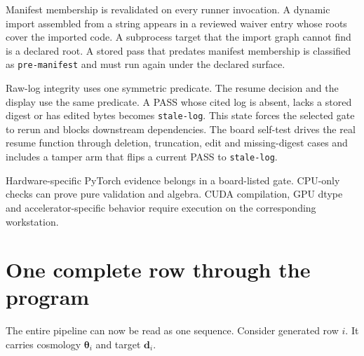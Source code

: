\documentclass[10pt,aps,prd,twocolumn,nofootinbib]{revtex4-2}
\newcommand{\code}[1]{\texttt{#1}}
\newcommand{\btheta}{\boldsymbol{\theta}}
\newcommand{\bd}{\mathbf{d}}
\begin{document}
Manifest membership is revalidated on every runner invocation.  A dynamic
import assembled from a string appears in a reviewed waiver entry whose roots
cover the imported code.  A subprocess target that the import graph cannot
find is a declared root.  A stored pass that predates manifest membership is
classified as \code{pre-manifest} and must run again under the declared
surface.

Raw-log integrity uses one symmetric predicate.  The resume decision and the
display use the same predicate.  A PASS whose cited log is absent, lacks a
stored digest or has edited bytes becomes \code{stale-log}.  This state forces
the selected gate to rerun and blocks downstream dependencies.  The board self-test
drives the real resume function through deletion, truncation, edit and
missing-digest cases and includes a tamper arm that flips a current PASS to
\code{stale-log}.

Hardware-specific PyTorch evidence belongs in a board-listed gate.  CPU-only
checks can prove pure validation and algebra.  CUDA compilation, GPU dtype
and accelerator-specific behavior require execution on the corresponding
workstation.

\section{One complete row through the program}
\label{chap:trace}

The entire pipeline can now be read as one sequence.  Consider generated row
$i$.  It carries cosmology $\btheta_i$ and target $\bd_i$.
\end{document}
